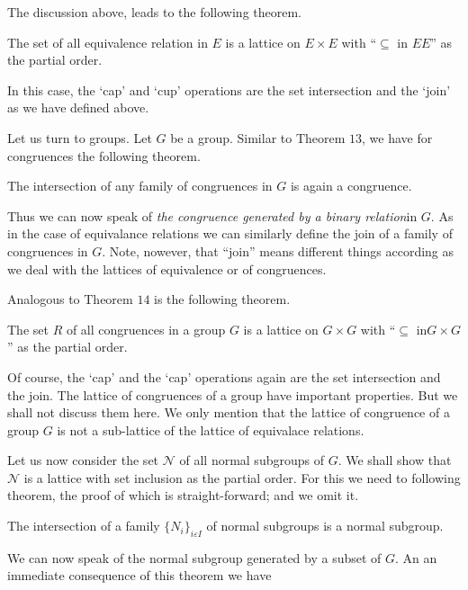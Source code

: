 The discussion above, leads to the following theorem. 
\begin{Theorem}%
  The set of all equivalence relation in $E$ is a lattice on $E\times
  E $ with ``$\subseteq \text{ in } E E$'' as the partial order. 
\end{Theorem} 
 
In this case, the `cap' and `cup' operations are the set intersection
and the `join' as we have defined above. 
 
Let us turn to groups. Let $G$ be a group. Similar to Theorem $13$, we
have for congruences the following theorem. 
\begin{Theorem} %
  The intersection of any family of congruences in $G$ is again a congruence.
\end{Theorem}

Thus we can now speak of \textit{the congruence generated by a binary
  relation}in $G$. As in the case of equivalance relations we can
similarly define the join  of a family of congruences in $G$. Note,
nowever, that ``join'' means different things according as we deal
with the lattices of equivalence or of congruences.  

Analogous to Theorem $14$ is the following theorem.
\begin{Theorem} %
  The set $R$ of all congruences in a group $G$ is a lattice on $G
  \times G$ with ``$ \subseteq \text { in} G \times G$'' as the
  partial order.  
\end{Theorem}  
 
Of course, the `cap' and the `cap' operations again are the set
intersection and the join. The lattice of congruences of a group have
important properties. But we shall not discuss them here. We only
mention that the lattice of congruence of a group $G$ is not a
sub-lattice of the lattice of equivalace relations.   

Let us now consider the set $\mathscr{N}$ of all normal subgroups of
$G$. We shall show that $\mathscr{N}$ is a lattice with set inclusion
as the partial order. For this we need to following theorem, the proof
of which is straight-forward; and we omit it.   

\begin{Theorem} %
  The intersection of a family $\{ N_i\}_{i \varepsilon I}$ of normal
  subgroups is a normal subgroup. 
\end{Theorem} 

We can now speak of the normal subgroup generated by a subset of
$G$. An an immediate consequence of this theorem we have 
 
